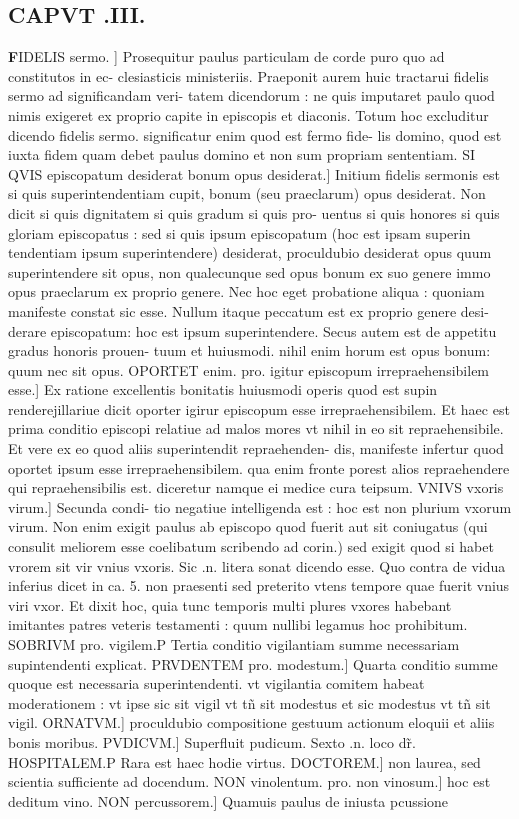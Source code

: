 \documentclass{article}
\begin{document}
\begin{pages}
\endnumbering\beginnumbering\section{CAPVT .III.}\pstart \huge\textbf{F}\normalsize IDELIS sermo. ] Prosequitur paulus particulam de corde puro  quo ad constitutos in ec- clesiasticis ministeriis. Praeponit aurem huic tractarui fidelis sermo  ad significandam veri- tatem dicendorum : ne quis imputaret paulo quod nimis exigeret ex proprio capite in episcopis et diaconis. Totum hoc excluditur  dicendo fidelis sermo. significatur enim quod est fermo fide- lis domino, quod est iuxta fidem quam debet paulus domino  et non sum propriam sententiam. SI QVIS episcopatum desiderat  bonum opus desiderat.] Initium fidelis sermonis est si quis superintendentiam cupit, bonum (seu praeclarum) opus desiderat. Non dicit si quis dignitatem  si quis gradum  si quis pro- uentus  si quis honores  si quis gloriam episcopatus : sed si quis ipsum episcopatum (hoc est ipsam superin tendentiam  ipsum superintendere) desiderat, proculdubio desiderat opus quum superintendere sit opus, non qualecunque  sed opus bonum ex suo genere  immo opus praeclarum ex proprio genere. Nec hoc eget probatione aliqua : quoniam manifeste constat sic esse. Nullum itaque  peccatum est ex proprio genere  desi- derare episcopatum: hoc est ipsum superintendere. Secus autem est de appetitu gradus  honoris  prouen- tuum et huiusmodi. nihil enim horum est opus bonum: quum nec sit opus. OPORTET enim. pro. igitur  episcopum irrepraehensibilem esse.] Ex ratione excellentis bonitatis huiusmodi operis quod est supin renderejillariue dicit oporter igirur episcopum esse irrepraehensibilem. Et haec est prima conditio episcopi relatiue ad malos mores  vt nihil in eo sit repraehensibile. Et vere ex eo quod aliis superintendit repraehenden- dis, manifeste infertur quod oportet ipsum esse irrepraehensibilem. qua enim fronte porest alios repraehendere qui repraehensibilis est. diceretur namque  ei  medice cura teipsum. VNIVS vxoris virum.] Secunda condi- tio negatiue intelligenda est : hoc est non plurium vxorum virum. Non enim exigit paulus ab episcopo quod fuerit aut sit coniugatus (qui consulit meliorem esse coelibatum  scribendo ad corin.) sed exigit quod si habet vrorem sit vir vnius vxoris. Sic .n. litera sonat  dicendo esse. Quo contra de vidua inferius dicet in ca. 5. non praesenti sed preterito vtens tempore  quae fuerit vnius viri vxor. Et dixit hoc, quia tunc temporis multi plures vxores habebant  imitantes patres veteris testamenti : quum nullibi legamus hoc prohibitum. SOBRIVM pro. vigilem.P Tertia conditio vigilantiam summe necessariam supintendenti explicat. PRVDENTEM pro. modestum.] Quarta conditio summe quoque  est necessaria superintendenti. vt vigilantia comitem habeat moderationem : vt ipse sic sit vigil vt tñ sit modestus  et sic modestus vt tñ sit vigil. ORNATVM.] proculdubio compositione gestuum  actionum  eloquii  et aliis bonis moribus. PVDICVM.] Superfluit pudicum. Sexto .n. loco dr̃. HOSPITALEM.P Rara est haec hodie virtus. DOCTOREM.] non laurea, sed scientia sufficiente ad docendum. NON vinolentum. pro. non vinosum.] hoc est deditum vino. NON percussorem.] Quamuis paulus de iniusta pcussione 
\end{pages}
\end{document}
